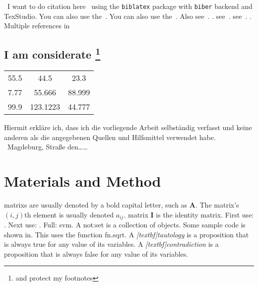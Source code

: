 \documentclass[oneside]{scrbook} %
\begin{document}
\ I want to do citation here~\parencite{becker_cutting_2006} using the \verb|biblatex| package with \verb|biber| backend and TexStudio. You can also use the~\textcite{becker_cutting_2006}. You can also use the~\parencite{hebenstreit_analysis_2011}. Also see~\parencite{wickham_ggplot2:_2009}. \parencite{matthias_kohl_slqpcr:_2007}.
see~\parencite{kennedy_pcr_2011}.
see~\parencite{vignali_il-12_2012}.
\parencite{akira_role_2000}. Multiple references in \parencites(compare)(){aihara_mechanisms_1997}[34]{aggarwal_interleukin-23_2003}

\section{I am considerate
\protect\footnote{and protect my footnotes}}
\begin{table}[H]
\begin{tabular}{SSS}%
55.5 & 44.5 & 23.3 \\
7.77 & 55.666 & 88.999\\	
99.9 & 123.1223 & 44.777 \\
\end{tabular}
\end{table}
\par
Hiermit erkl\"are ich, dass ich die vorliegende Arbeit selbst\"andig verfasst und keine anderen als die angegebenen Quellen und Hilfsmittel verwendet habe.\\
\ Magdeburg, Stra\ss e den\ldots\ldots
\chapter{Materials and Method}
\Glspl{matrix} are usually denoted by a bold capital letter, such
as $\mathbf{A}$. The \gls{matrix}'s $(i,j)$th element is usually
denoted $a_{ij}$. \Gls{matrix} $\mathbf{I}$ is the identity
\gls{matrix}.
First use: \@. Next use: \@. Full: \gls{svm}\@.
A \gls{not:set} is a collection of objects.
Some sample code is shown in. This uses the function \gls{fn.sqrt}.
A \emph{\gls{[textbf]tautology}} is a proposition that is always true for any 
value of its variables.
A \emph{\gls{[textbf]contradiction}} is a proposition that is always false for any value of its variables.
%
\end{document}
